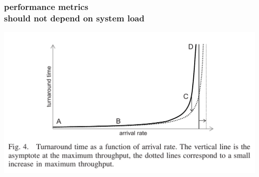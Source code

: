 \documentclass[utf8,10pt]{beamer}
\begin{document}
\begin{frame}
  \frametitle{performance metrics \\should not depend on system load
    }
  \centering
  \includegraphics[height=0.7\textheight, keepaspectratio]{./arrival_rate}
\end{frame}
\end{document}
